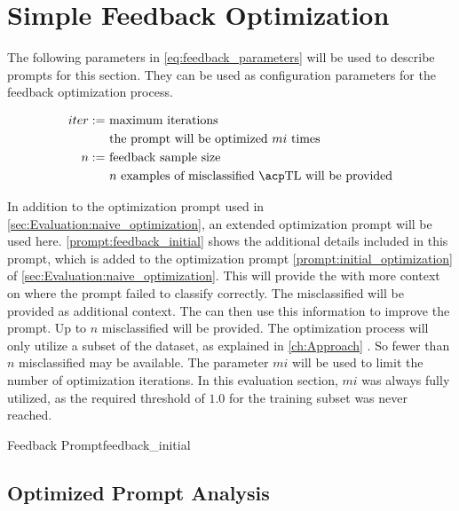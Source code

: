 \newpage


\section{Simple Feedback Optimization}
\label{sec:Evaluation:simple_feedback_optimization}

The following parameters in \autoref{eq:feedback_parameters} will be used to describe prompts for this section.
They can be used as configuration parameters for the feedback optimization process.

\begin{equation}
    \label{eq:feedback_parameters}
    \begin{aligned}
        iter := & \ \text{maximum iterations} \\
        & \ \text{the prompt will be optimized $mi$ times} \\
        n :=    & \ \text{feedback sample size} \\
        & \ \text{$n$ examples of misclassified \TLs will be provided}
    \end{aligned}
\end{equation}

In addition to the optimization prompt used in \autoref{sec:Evaluation:naive_optimization}, an extended optimization prompt will be used here.
\autoref{prompt:feedback_initial} shows the additional details included in this prompt, which is added to the optimization prompt \autoref{prompt:initial_optimization} of \autoref{sec:Evaluation:naive_optimization}.
This will provide the \LLM with more context on where the prompt failed to classify correctly.
The misclassified \TLs will be provided as additional context.
The \LLM can then use this information to improve the prompt.
Up to $n$ misclassified \TLs will be provided.
The optimization process will only utilize a subset of the dataset, as explained in \autoref{ch:Approach} .
So fewer than $n$ misclassified \TLs may be available.
The parameter $mi$ will be used to limit the number of optimization iterations.
In this evaluation section, $mi$ was always fully utilized, as the required \fone threshold of $1.0$ for the training subset was never reached.

\begin{prompt}{Feedback Prompt}{feedback_initial}
    \\
    
\end{prompt}

\subsection{Optimized Prompt Analysis}
\label{subsec:Evaluation:simple_feedback:optimized-prompt-analysis}

